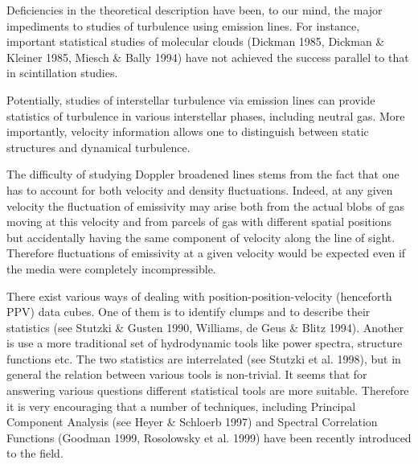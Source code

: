 Deficiencies in the theoretical description have been, to our mind, the
major impediments to studies of turbulence using emission lines. 
For instance, important statistical studies of molecular clouds 
(Dickman 1985, Dickman \& Kleiner 1985, Miesch \& Bally 1994) have not
achieved the success parallel to that in scintillation studies. 

Potentially, studies of interstellar turbulence via emission lines
can provide statistics of turbulence in various 
interstellar phases, including neutral gas. More importantly, velocity
information allows one to distinguish between
static structures and  dynamical turbulence.

The difficulty of studying Doppler broadened lines stems from the fact
that
one has to account for both velocity and density fluctuations. Indeed,
at any given velocity the fluctuation of emissivity may arise both
from the actual blobs of gas moving at this velocity and from parcels
of gas with different spatial positions but accidentally having the same
component of velocity along the line of sight. Therefore fluctuations
of emissivity at a given velocity would be expected even if the media were
completely incompressible. 

There exist various ways of dealing with position-position-velocity 
(henceforth
PPV)
data cubes. One of them is to identify clumps and to describe their
statistics (see Stutzki \& Gusten 1990, Williams, de Geus \& Blitz 1994).
Another is use a more traditional set of hydrodynamic tools like
power spectra, structure functions etc. The two statistics are interrelated
(see Stutzki et al. 1998), but in general the relation between various
tools is non-trivial. It seems that for answering various
questions different statistical tools are more suitable. Therefore
it is very encouraging that a number of techniques, including Principal
Component Analysis (see Heyer \& Schloerb 1997) and Spectral Correlation
Functions (Goodman 1999, Rosolowsky et al. 1999) have been 
recently introduced to the field. 

